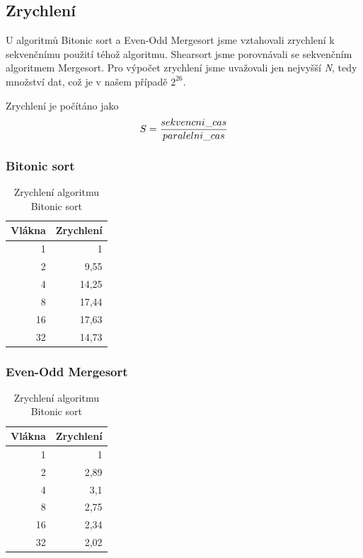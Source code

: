 \documentclass[12pt]{article}
\begin{document}
\subsection{Zrychlení}
U algoritmů Bitonic sort a Even-Odd Mergesort jsme vztahovali zrychlení k sekvenčnímu použití téhož algoritmu.
Shearsort jsme porovnávali se sekvenčním algoritmem Mergesort. Pro výpočet zrychlení jsme uvažovali jen
nejvyšší \emph{N}, tedy množství dat, což je v našem případě \(2^{26}\).

Zrychlení je počítáno jako $$S = {{sekvencni\_cas}\over{paralelni\_cas}}$$

\subsubsection{Bitonic sort}
\begin{table}[H]
\begin{center}
\begin{tabular}{|r|r|}
\hline Vlákna & Zrychlení \\ \hline
1	& 1 \\ \hline
2	& 9,55 \\ \hline
4	& 14,25 \\ \hline
8	& 17,44 \\ \hline
16	& 17,63 \\ \hline
32	& 14,73 \\ \hline
\end{tabular} 
\end{center}
\caption{Zrychlení algoritmu Bitonic sort}
\end{table}

\subsubsection{Even-Odd Mergesort}
\begin{table}[H]
\begin{center}
\begin{tabular}{|r|r|}
\hline Vlákna & Zrychlení \\ \hline
1  & 1      \\ \hline
2  & 2,89   \\ \hline
4  & 3,1    \\ \hline
8  & 2,75   \\ \hline
16 & 2,34   \\ \hline
32 & 2,02   \\ \hline
\end{tabular} 
\end{center}
\caption{Zrychlení algoritmu Bitonic sort}
\end{table}
\end{document}
